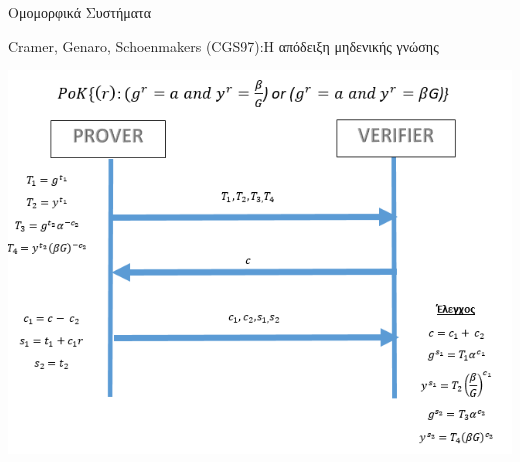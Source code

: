\documentclass[handout]{beamer}
\begin{document}
\begin{section}{Ομομορφικά Συστήματα}
\begin{frame}{Cramer, Genaro, Schoenmakers (CGS97):Η απόδειξη μηδενικής γνώσης}
    \begin{center}
        \includegraphics[scale=0.5]{cgs97.PNG}
    \end{center}
\end{frame}

\end{section} 
\end{document}
